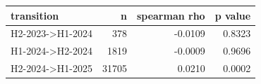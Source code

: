 \begin{tabular}{lrrr}
\toprule
transition & n & spearman rho & p value \\
\midrule
H2-2023->H1-2024 & 378 & -0.0109 & 0.8323 \\
H1-2024->H2-2024 & 1819 & -0.0009 & 0.9696 \\
H2-2024->H1-2025 & 31705 & 0.0210 & 0.0002 \\
\bottomrule
\end{tabular}
